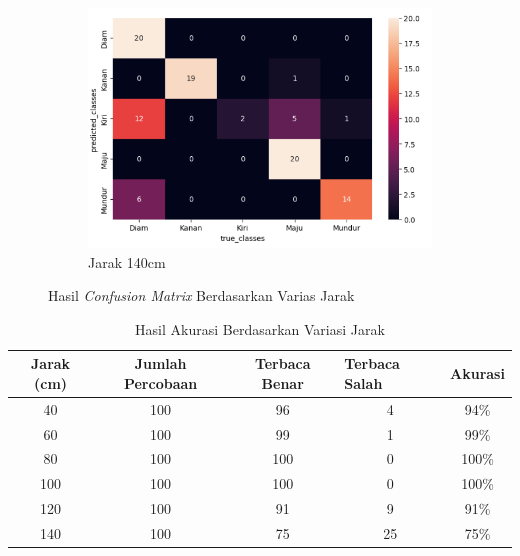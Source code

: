 \begin{figure}[H]
\begin{subfigure}{0.4\textwidth}
    \includegraphics[width=\linewidth]{../Gambar/cm140.png}
    \caption{Jarak 140cm}
    \label{fig:cm140}
  \end{subfigure}
  \centering
  \caption{Hasil \emph{Confusion Matrix} Berdasarkan  Varias Jarak}
  \label{fig:confusionmatrixjarak}
\end{figure}

\begin{table}[H]
  \centering
  \caption{Hasil Akurasi Berdasarkan Variasi Jarak}
  \label{tab:hasiljarak}
  \begin{tabular}{|c|c|c|c|c|}
    \hline
    Jarak (cm) & Jumlah Percobaan & Terbaca Benar & \multicolumn{1}{l|}{Terbaca Salah} & \multicolumn{1}{l|}{Akurasi} \\ \hline
    40         & 100              & 96           & 4                                  & 94\%                        \\ \hline
    60         & 100              & 99           & 1                                  & 99\%                         \\ \hline
    80         & 100              & 100           & 0                                  & 100\%                         \\ \hline
    100        & 100              & 100           & 0                                  & 100\%                         \\ \hline
    120        & 100              & 91            & 9                                 & 91\%                         \\ \hline
    140        & 100              & 75            & 25                                 & 75\%                         \\ \hline
    \end{tabular}
\end{table}


